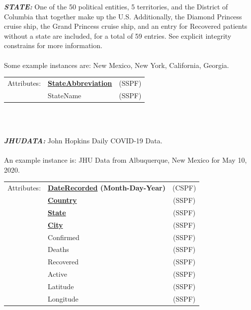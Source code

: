 \documentclass[11pt]{article}
\begin{document}
\begin{description}
\item{\em\bf STATE:} One of the 50 political entities, 5 territories, and the District of Columbia that together make up the U.S. Additionally, the Diamond Princess cruise ship, the Grand Princess cruise ship, and an entry for Recovered patients without a state are included, for a total of 59 entries. See explicit integrity constrains for more information. \\ \\

Some example instances are: New Mexico, New York, California, Georgia. \\
 
\begin{tabular}{llc}
 Attributes: & {\bf \underline{StateAbbreviation}} &  (SSPF) \\
	    & StateName &  (SSPF) \\
\end{tabular} \\
\\

\pagebreak

\item{\em\bf JHUDATA:} John Hopkins Daily COVID-19 Data. \\ \\

An example instance is: JHU Data from Albuquerque, New Mexico for May 10, 2020. \\
 
\begin{tabular}{llc}
 Attributes: & {\bf \underline{DateRecorded} (Month-Day-Year)} &  (CSPF) \\
	    & {\bf \underline{Country}} &  (SSPF) \\
	    & {\bf \underline{State}} & (SSPF) \\
	    & {\bf \underline{City}} & (SSPF) \\
	    & Confirmed & (SSPF) \\
	    & Deaths & (SSPF) \\
	    & Recovered & (SSPF) \\
	    & Active & (SSPF) \\
	    & Latitude & (SSPF) \\
	    & Longitude & (SSPF) \\
\end{tabular} \\
\\


\end{description}
\end{document}
